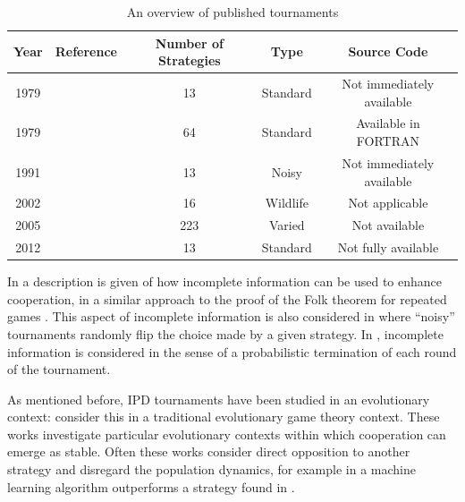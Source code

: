 \documentclass{article}
\begin{document}
\begin{table}[!hbtp]
    \begin{center}
        \begin{tabular}{ccccc}
            \toprule
            Year     & Reference                  & Number of Strategies & Type     & Source Code\\
            \midrule
            1979     & \cite{Axelrod1980a}        & 13                   & Standard & Not immediately available\\
            1979     & \cite{Axelrod1980b}        & 64                   & Standard & Available in FORTRAN\\
            1991     & \cite{Bendor1991}          & 13                   & Noisy    & Not immediately available\\
            2002     & \cite{Stephens2002}        & 16                   & Wildlife & Not applicable\\
            2005     & \cite{kendall2007iterated} & 223                  & Varied   & Not available \\
            2012     & \cite{Stewart2012}         & 13                   & Standard & Not fully available \\
            \bottomrule
        \end{tabular}
    \end{center}
    \caption{An overview of published tournaments}\label{tab:tournaments}
\end{table}

In \cite{Milgrom1982} a description is given of how incomplete information can
be used to enhance cooperation, in a similar approach to the proof of the Folk
theorem for repeated games \cite{Maschler2013}. This aspect of incomplete
information is also considered in \cite{Molander1985, Bendor1991, Lee2015} where
``noisy'' tournaments randomly flip the choice made by a given strategy. In
\cite{Murnighan2015}, incomplete information is considered in the sense of a
probabilistic termination of each round of the tournament.

As mentioned before, IPD tournaments have been studied in an evolutionary
context: \cite{Ellison1994, Lee2015, Press2012, Stewart2012} consider this in a
traditional evolutionary game theory context. These works investigate
particular evolutionary contexts within which cooperation can emerge as stable.
Often these works consider direct opposition to another strategy and disregard
the population dynamics, for example in \cite{Lee2015} a machine learning
algorithm outperforms a strategy found in \cite{Press2012}.
\end{document}
